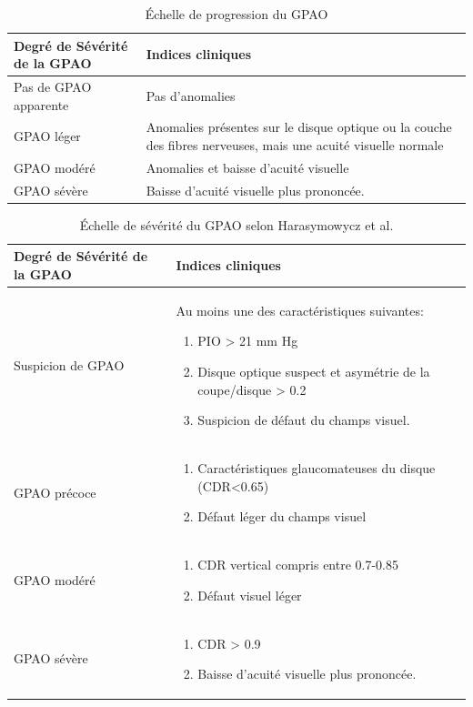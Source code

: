 \begin{table}[!ht]
	\centering
	\caption{Échelle de progression du \ac{GPAO}}
	\label{tab:GPAO}
	\begin{tabular}{p{}p{}} 
		\toprule
		Degré de Sévérité  de la \ac{GPAO} & Indices cliniques\\ 
		\toprule
		\rowcolor[gray]{0.95} Pas de \ac{GPAO} apparente & Pas d'anomalies\\ 
		\ac{GPAO} léger & Anomalies présentes sur le disque optique ou la couche des fibres nerveuses, mais une acuité visuelle normale\\
		\rowcolor[gray]{0.95}\ac{GPAO} modéré & Anomalies et baisse d'acuité visuelle\\ 
		\ac{GPAO} sévère &  Baisse d'acuité visuelle plus prononcée. \\
		\bottomrule
	\end{tabular}	
\end{table}

\begin{table}
	\centering
	\caption{Échelle de sévérité du \ac{GPAO} selon Harasymowycz et al.\cite{harasymowyczMedicalManagementGlaucoma2016}}
	\label{tab:CanadianGPAO}
	\begin{tabular}{p{}p{}} 
		\toprule
		Degré de Sévérité  de la \ac{GPAO} & Indices cliniques\\ 
		\toprule
		\rowcolor[gray]{0.95} Suspicion de \ac{GPAO} & Au moins une des caractéristiques suivantes: \begin{enumerate}
			\item \ac{PIO} > 21 mm Hg
			\item Disque optique suspect et asymétrie de la coupe/disque > 0.2
			\item Suspicion de défaut du champs visuel.
		\end{enumerate}
		\\ 
		\ac{GPAO} précoce & 
		\begin{enumerate}
			\item Caractéristiques glaucomateuses du disque (\ac{CDR}<0.65)
			\item Défaut léger du champs visuel
		\end{enumerate}
		\\
		\rowcolor[gray]{0.95}\ac{GPAO} modéré & \begin{enumerate}
			\item \ac{CDR} vertical compris entre 0.7-0.85
			\item Défaut visuel léger
		\end{enumerate}
		\\ 
		\ac{GPAO} sévère &  \begin{enumerate}
			\item  \ac{CDR} > 0.9
			\item Baisse d'acuité visuelle plus prononcée. 
		\end{enumerate}
		\\
		\bottomrule
	\end{tabular}	
\end{table}




